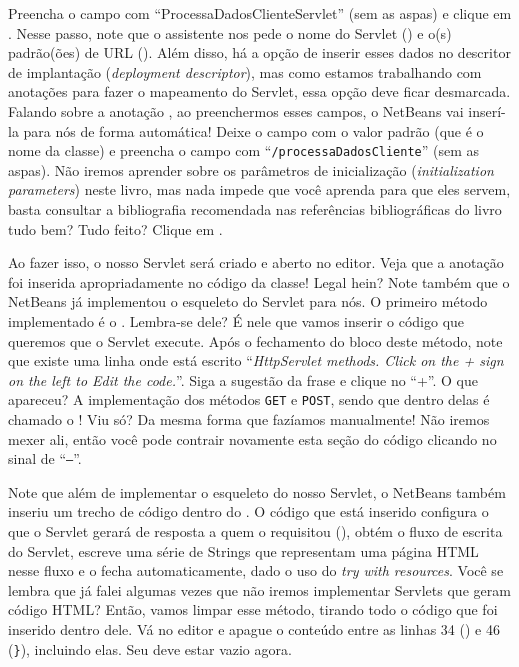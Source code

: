 Preencha o campo  com ``ProcessaDadosClienteServlet'' (sem as aspas) e clique em . Nesse passo, note que o assistente nos pede o nome do Servlet () e o(s) padrão(ões) de URL (). Além disso, há a opção de inserir esses dados no descritor de implantação (\textit{deployment descriptor}), mas como estamos trabalhando com anotações para fazer o mapeamento do Servlet, essa opção deve ficar desmarcada. Falando sobre a anotação , ao preenchermos esses campos, o NetBeans vai inserí-la para nós de forma automática! Deixe o campo  com o valor padrão (que é o nome da classe) e preencha o campo  com ``\texttt{/processaDadosCliente}'' (sem as aspas). Não iremos aprender sobre os parâmetros de inicialização (\textit{initialization parameters}) neste livro, mas nada impede que você aprenda para que eles servem, basta consultar a bibliografia recomendada nas referências bibliográficas do livro tudo bem? Tudo feito? Clique em .

Ao fazer isso, o nosso Servlet será criado e aberto no editor. Veja que a anotação  foi inserida apropriadamente no código da classe! Legal hein? Note também que o NetBeans já implementou o esqueleto do Servlet para nós. O primeiro método implementado é o . Lembra-se dele? É nele que vamos inserir o código que queremos que o Servlet execute. Após o fechamento do bloco deste método, note que existe uma linha onde está escrito ``\textit{HttpServlet methods. Click on the + sign on the left to Edit the code.}''. Siga a sugestão da frase e clique no ``+''. O que apareceu? A implementação dos métodos \texttt{GET} e \texttt{POST}, sendo que dentro delas é chamado o ! Viu só? Da mesma forma que fazíamos manualmente! Não iremos mexer ali, então você pode contrair novamente esta seção do código clicando no sinal de ``\texttt{–}''.

Note que além de implementar o esqueleto do nosso Servlet, o NetBeans também inseriu um trecho de código dentro do . O código que está inserido configura o que o Servlet gerará de resposta a quem o requisitou \linebreak(), obtém o fluxo de escrita do Servlet, escreve uma série de Strings que representam uma página HTML nesse fluxo e o fecha automaticamente, dado o uso do \textit{try with resources}. Você se lembra que já falei algumas vezes que não iremos implementar Servlets que geram código HTML? Então, vamos limpar esse método, tirando todo o código que foi inserido dentro dele. Vá no editor e apague o conteúdo entre as linhas 34 () e 46 (\texttt{\}}), incluindo elas. Seu  deve estar vazio agora.

